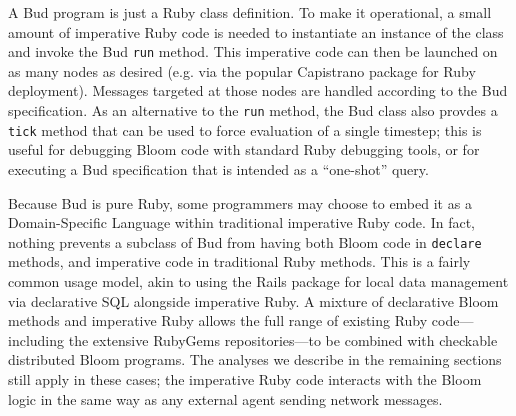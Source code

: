 A Bud program is just a Ruby class definition.  To make it operational, a small amount of imperative Ruby code is needed to instantiate an instance of the class and invoke the Bud \texttt{run} method.  This imperative code can then be launched on as many nodes as desired (e.g. via the popular Capistrano package for Ruby deployment).  Messages targeted at those nodes are handled according to the Bud specification.  As an alternative to the \texttt{run} method, the Bud class also provdes a \texttt{tick} method that can be used to force evaluation of a single timestep; this is useful for debugging Bloom code with standard Ruby debugging tools, or for executing a Bud specification that is intended as a ``one-shot'' query.

Because Bud is pure Ruby, some programmers may choose to embed it as a Domain-Specific Language within traditional imperative Ruby code.  In fact, nothing prevents a subclass of Bud from having both Bloom code in \texttt{declare} methods, and imperative code in traditional Ruby methods.  This is a fairly common usage model, akin to using the Rails package for local data management via declarative SQL alongside imperative Ruby. A mixture of declarative Bloom methods and imperative Ruby allows the full range of existing Ruby code---including the extensive RubyGems repositories---to be combined with checkable distributed Bloom programs. The analyses we describe in the remaining sections still apply in these cases; the imperative Ruby code interacts with the Bloom logic in the same way as any external agent sending network messages.
